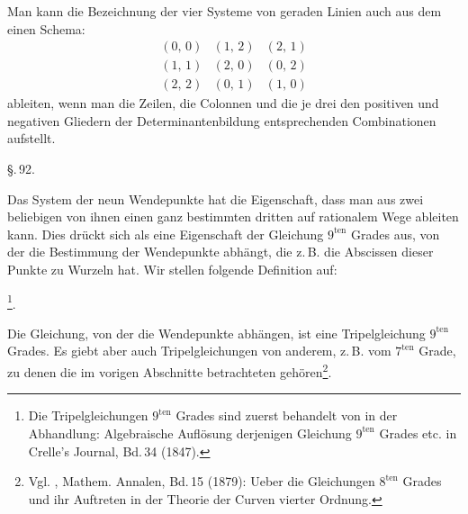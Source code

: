
Man kann die Bezeichnung der vier Systeme von geraden
Linien auch aus dem einen Schema:
\[
\begin{array}{ccc}
(0,\,0) & (1,\,2) & (2,\,1)\\
(1,\,1) & (2,\,0) & (0,\,2)\\
(2,\,2) & (0,\,1) & (1,\,0)
\end{array}
\]
ableiten, wenn man die Zeilen, die Colonnen und die je drei
den positiven und negativen Gliedern der Determinantenbildung
entsprechenden Combinationen aufstellt.

\S.\,92.


Das System der neun Wendepunkte hat die Eigenschaft,
dass man aus zwei beliebigen von ihnen einen ganz bestimmten
dritten auf rationalem Wege ableiten kann. Dies drückt sich
als eine Eigenschaft der Gleichung $9^{\text{ten}}$ Grades aus, von der die
Bestimmung der Wendepunkte abhängt, die z.\,B. die Abscissen
dieser Punkte zu Wurzeln hat. Wir stellen folgende Definition
auf:

\footnote{Die Tripelgleichungen $9^{\text{ten}}$ Grades sind zuerst behandelt von
 in der Abhandlung: \glqq Algebraische Auflösung derjenigen Gleichung
$9^{\text{ten}}$ Grades etc.\grqq{} in Crelle's Journal, Bd.\,34 (1847).}.

Die Gleichung, von der die Wendepunkte abhängen, ist eine
Tripelgleichung $9^{\text{ten}}$ Grades. Es giebt aber auch Tripelgleichungen
von anderem, z.\,B. vom $7^{\text{ten}}$ Grade, zu denen die im vorigen
Abschnitte betrachteten gehören\footnote{Vgl. , Mathem. Annalen, Bd.\,15 (1879): \glqq Ueber die Gleichungen
$8^{\text{ten}}$ Grades und ihr Auftreten in der Theorie der Curven vierter
Ordnung.\grqq{}}.
